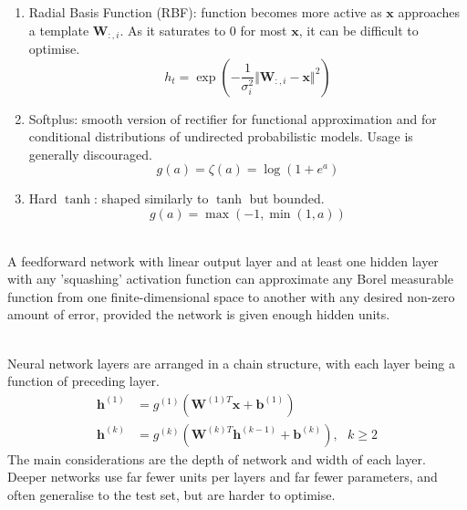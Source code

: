 \begin{definition}
\begin{enumerate}[label=\roman*.]
\item Radial Basis Function (RBF): function becomes more active as $\bm{x}$ approaches a template $\bm{W}_{:, i}$. As it saturates to $0$ for most $\bm{x}$, it can be difficult to optimise.
\begin{equation*}
h_t = \exp \left( - \frac{1}{\sigma^2_i} \Vert \bm{W}_{:, i} - \bm{x} \Vert^2 \right) \nonumber
\end{equation*}
\item Softplus: smooth version of rectifier for functional approximation and for conditional distributions of undirected probabilistic models. Usage is generally discouraged.
\begin{equation*}
g(a) = \zeta(a) = \log(1 + e^a) \nonumber
\end{equation*}
\item Hard $\tanh$: shaped similarly to $\tanh$ but bounded.
\begin{equation*}
g(a) = \max(-1, \min(1,a)) \nonumber
\end{equation*}
\end{enumerate}
\end{definition}

\begin{theorem} \\
A feedforward network with linear output layer and at least one hidden layer with any 'squashing' activation function can approximate any Borel measurable function from one finite-dimensional space to another with any desired non-zero amount of error, provided the network is given enough hidden units.
\end{theorem}

\begin{method} \\
Neural network layers are arranged in a chain structure, with each layer being a function of preceding layer.
\begin{align}
\bm{h}^{(1)} &= g^{(1)} (\bm{W}^{(1)T} \bm{x} + \bm{b}^{(1)}) \nonumber \\
\bm{h}^{(k)} &= g^{(k)} (\bm{W}^{(k)T} \bm{h}^{(k-1)} + \bm{b}^{(k)}), \ \ \ k \geq 2 \nonumber
\end{align}
The main considerations are the depth of network and width of each layer. Deeper networks use far fewer units per layers and far fewer parameters, and often generalise to the test set, but are harder to optimise.
\end{method}


